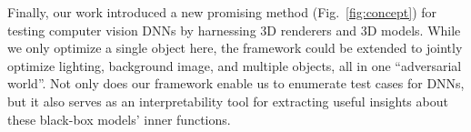 \documentclass[10pt,twocolumn,letterpaper]{article}
\begin{document}
Finally, our work introduced a new promising method (Fig.~\ref{fig:concept}) for testing computer vision DNNs by harnessing 3D renderers and 3D models.
While we only optimize a single object here, the framework could be extended to jointly optimize lighting, background image, and multiple objects, all in one ``adversarial world''.
Not only does our framework enable us to enumerate test cases for DNNs, but it also serves as an interpretability tool for extracting useful insights about these black-box models' inner functions.



\end{document}
